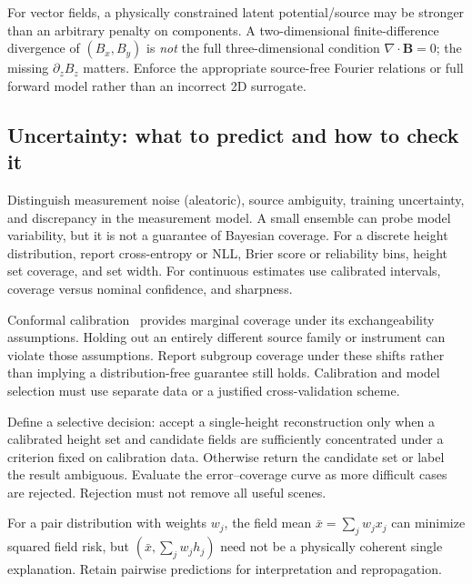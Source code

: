 For vector fields, a physically constrained latent potential/source may be stronger than an arbitrary penalty on components. A two-dimensional finite-difference divergence of $(B_x,B_y)$ is \emph{not} the full three-dimensional condition $\nabla\cdot\mathbf B=0$; the missing $\partial_z B_z$ matters. Enforce the appropriate source-free Fourier relations or full forward model rather than an incorrect 2D surrogate.

\subsection{Uncertainty: what to predict and how to check it}
Distinguish measurement noise (aleatoric), source ambiguity, training uncertainty, and discrepancy in the measurement model. A small ensemble can probe model variability, but it is not a guarantee of Bayesian coverage. For a discrete height distribution, report cross-entropy or NLL, Brier score or reliability bins, height set coverage, and set width. For continuous estimates use calibrated intervals, coverage versus nominal confidence, and sharpness.

Conformal calibration~\cite{conformal} provides marginal coverage under its exchangeability assumptions. Holding out an entirely different source family or instrument can violate those assumptions. Report subgroup coverage under these shifts rather than implying a distribution-free guarantee still holds. Calibration and model selection must use separate data or a justified cross-validation scheme.

Define a selective decision: accept a single-height reconstruction only when a calibrated height set and candidate fields are sufficiently concentrated under a criterion fixed on calibration data. Otherwise return the candidate set or label the result ambiguous. Evaluate the error--coverage curve as more difficult cases are rejected. Rejection must not remove all useful scenes.

For a pair distribution with weights $w_j$, the field mean $\bar x=\sum_jw_jx_j$ can minimize squared field risk, but $(\bar x,\sum_jw_jh_j)$ need not be a physically coherent single explanation. Retain pairwise predictions for interpretation and repropagation.

